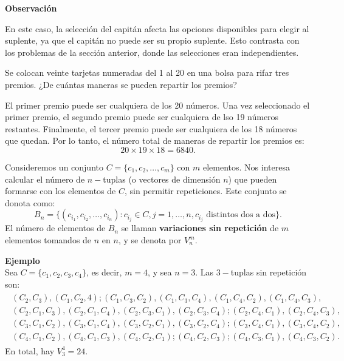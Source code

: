 \documentclass[12pt,a4paper]{book}
\begin{document}
    \textbf{Observación}
    
    En este caso, la selección del capitán afecta las opciones disponibles para elegir al suplente, ya que el capitán no puede ser su propio suplente. Esto contrasta con los problemas de la sección anterior, donde las selecciones eran independientes.

    \begin{mdframed}[style=mdgraybox, frametitle={Problema 16: Reparto de premios}]
        Se colocan veinte tarjetas numeradas del 1 al 20 en una bolsa para rifar tres premios. ¿De cuántas maneras se pueden repartir los premios?
    \end{mdframed}

    \begin{solucion}
        El primer premio puede ser cualquiera de los 20 números. Una vez seleccionado el primer premio, el segundo premio puede ser cualquiera de lso 19 números restantes. Finalmente, el tercer premio puede ser cualquiera de los 18 números que quedan. Por lo tanto, el número total de maneras de repartir los premios es:
        \begin{equation*}
            20\times19\times18=6840.
        \end{equation*}
    \end{solucion}
    Consideremos un conjunto $C=\{c_{1},c_{2},\dots,c_{m}\}$ con $m$ elementos. Nos interesa calcular el número de $n-$tuplas (o vectores de dimensión $n$) que pueden formarse con los elementos de $C$, sin permitir repeticiones. Este conjunto se donota como:
    \begin{equation*}
        B_{n}=\{(c_{i_{1}},c_{i_{2}},\dots,c_{i_{n}}):c_{i_{j}}\in C,j=1,\dots,n,c_{i_{j}}\text{ distintos dos a dos}\}.
    \end{equation*}
    El número de elementos de $B_{n}$ se llaman \textbf{variaciones sin repetición} de $m$ elementos tomandos de $n$ en $n$, y se denota por $V_{n}^{m}$.
    
    \textbf{Ejemplo}\\
    Sea $C=\{c_{1},c_{2},c_{3},c_{4}\}$, es decir, $m=4$, y sea $n=3$. Las $3-$tuplas sin repetición son:
    \begin{align*}
        \begin{array}{c}
            (C_2, C_3), (C_1, C_2, 4); (C_1, C_3, C_2), (C_1, C_3, C_4), (C_1, C_4, C_2), (C_1, C_4, C_3), \\
            (C_2, C_1, C_3), (C_2, C_1, C_4), (C_2, C_3, C_1), (C_2, C_3, C_4); (C_2, C_4, C_1), (C_2, C_4, C_3), \\
            (C_3, C_1, C_2), (C_3, C_1, C_4), (C_3, C_2, C_1), (C_3, C_2, C_4); (C_3, C_4, C_1), (C_3, C_4, C_2), \\
            (C_4, C_1, C_2), (C_4, C_1, C_3), (C_4, C_2, C_1); (C_4, C_2, C_3); (C_4, C_3, C_1), (C_4, C_3, C_2).
        \end{array}
    \end{align*}
    En total, hay $V_{3}^{4}=24$.
\end{document}
